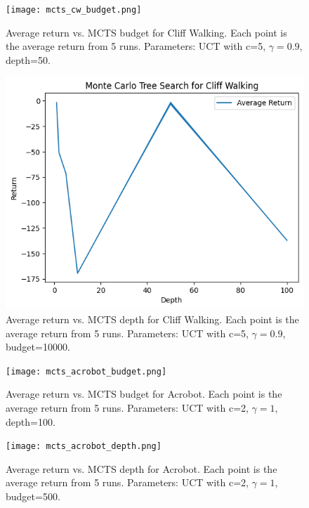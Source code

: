 \documentclass{article}
\begin{document}
\begin{figure}[!hb]
    \centering
    \begin{minipage}{0.48\textwidth}
        \centering
        \texttt{[image: mcts\_cw\_budget.png]}
        \caption{Average return vs. MCTS budget for Cliff Walking. Each point is the average return from 5 runs. Parameters: UCT with c=5, $\gamma=0.9$, depth=50.}
        \label{fig:4.2.1}
    \end{minipage}
    \hfill
    \begin{minipage}{0.48\textwidth}
        \centering
        \includegraphics[width=\linewidth]{mcts_cw_depth.png}
        \caption{Average return vs. MCTS depth for Cliff Walking. Each point is the average return from 5 runs. Parameters: UCT with c=5, $\gamma=0.9$, budget=10000.}
        \label{fig:4.2.2}
    \end{minipage}
\end{figure}

\begin{figure}[!hb]
    \centering
    \begin{minipage}{0.48\textwidth}
        \centering
        \texttt{[image: mcts\_acrobot\_budget.png]}
        \caption{Average return vs. MCTS budget for Acrobot. Each point is the average return from 5 runs. Parameters: UCT with c=2, $\gamma=1$, depth=100.}
        \label{fig:4.3.1}
    \end{minipage}
    \hfill
    \begin{minipage}{0.48\textwidth}
        \centering
        \texttt{[image: mcts\_acrobot\_depth.png]}
        \caption{Average return vs. MCTS depth for Acrobot. Each point is the average return from 5 runs. Parameters: UCT with c=2, $\gamma=1$, budget=500.}
        \label{fig:4.3.2}
    \end{minipage}
\end{figure}
\end{document}
